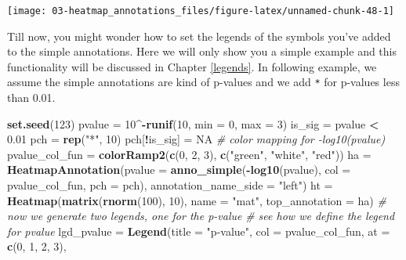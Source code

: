 \documentclass[]{book}
\newenvironment{Shaded}{\begin{snugshade}}{\end{snugshade}}
\newcommand{\KeywordTok}[1]{\textcolor[rgb]{0.13,0.29,0.53}{\textbf{#1}}}
\newcommand{\DataTypeTok}[1]{\textcolor[rgb]{0.13,0.29,0.53}{#1}}
\newcommand{\DecValTok}[1]{\textcolor[rgb]{0.00,0.00,0.81}{#1}}
\newcommand{\FloatTok}[1]{\textcolor[rgb]{0.00,0.00,0.81}{#1}}
\newcommand{\StringTok}[1]{\textcolor[rgb]{0.31,0.60,0.02}{#1}}
\newcommand{\CommentTok}[1]{\textcolor[rgb]{0.56,0.35,0.01}{\textit{#1}}}
\newcommand{\OtherTok}[1]{\textcolor[rgb]{0.56,0.35,0.01}{#1}}
\newcommand{\OperatorTok}[1]{\textcolor[rgb]{0.81,0.36,0.00}{\textbf{#1}}}
\newcommand{\NormalTok}[1]{#1}
\theoremstyle{definition}
\theoremstyle{definition}
\theoremstyle{definition}
\theoremstyle{remark}
\begin{document}
\begin{center}\texttt{[image: 03-heatmap\_annotations\_files/figure-latex/unnamed-chunk-48-1]} \end{center}

Till now, you might wonder how to set the legends of the symbols you've
added to the simple annotations. Here we will only show you a simple
example and this functionality will be discussed in Chapter
\ref{legends}. In following example, we assume the simple annotations
are kind of p-values and we add \texttt{*} for p-values less than 0.01.

\begin{Shaded}
\begin{Highlighting}[]
\KeywordTok{set.seed}\NormalTok{(}\DecValTok{123}\NormalTok{)}
\NormalTok{pvalue =}\StringTok{ }\DecValTok{10}\OperatorTok{^-}\KeywordTok{runif}\NormalTok{(}\DecValTok{10}\NormalTok{, }\DataTypeTok{min =} \DecValTok{0}\NormalTok{, }\DataTypeTok{max =} \DecValTok{3}\NormalTok{)}
\NormalTok{is_sig =}\StringTok{ }\NormalTok{pvalue }\OperatorTok{<}\StringTok{ }\FloatTok{0.01}
\NormalTok{pch =}\StringTok{ }\KeywordTok{rep}\NormalTok{(}\StringTok{"*"}\NormalTok{, }\DecValTok{10}\NormalTok{)}
\NormalTok{pch[}\OperatorTok{!}\NormalTok{is_sig] =}\StringTok{ }\OtherTok{NA}
\CommentTok{# color mapping for -log10(pvalue)}
\NormalTok{pvalue_col_fun =}\StringTok{ }\KeywordTok{colorRamp2}\NormalTok{(}\KeywordTok{c}\NormalTok{(}\DecValTok{0}\NormalTok{, }\DecValTok{2}\NormalTok{, }\DecValTok{3}\NormalTok{), }\KeywordTok{c}\NormalTok{(}\StringTok{"green"}\NormalTok{, }\StringTok{"white"}\NormalTok{, }\StringTok{"red"}\NormalTok{)) }
\NormalTok{ha =}\StringTok{ }\KeywordTok{HeatmapAnnotation}\NormalTok{(}\DataTypeTok{pvalue =} \KeywordTok{anno_simple}\NormalTok{(}\OperatorTok{-}\KeywordTok{log10}\NormalTok{(pvalue), }\DataTypeTok{col =}\NormalTok{ pvalue_col_fun, }\DataTypeTok{pch =}\NormalTok{ pch),}
    \DataTypeTok{annotation_name_side =} \StringTok{"left"}\NormalTok{)}
\NormalTok{ht =}\StringTok{ }\KeywordTok{Heatmap}\NormalTok{(}\KeywordTok{matrix}\NormalTok{(}\KeywordTok{rnorm}\NormalTok{(}\DecValTok{100}\NormalTok{), }\DecValTok{10}\NormalTok{), }\DataTypeTok{name =} \StringTok{"mat"}\NormalTok{, }\DataTypeTok{top_annotation =}\NormalTok{ ha)}
\CommentTok{# now we generate two legends, one for the p-value}
\CommentTok{# see how we define the legend for pvalue}
\NormalTok{lgd_pvalue =}\StringTok{ }\KeywordTok{Legend}\NormalTok{(}\DataTypeTok{title =} \StringTok{"p-value"}\NormalTok{, }\DataTypeTok{col =}\NormalTok{ pvalue_col_fun, }\DataTypeTok{at =} \KeywordTok{c}\NormalTok{(}\DecValTok{0}\NormalTok{, }\DecValTok{1}\NormalTok{, }\DecValTok{2}\NormalTok{, }\DecValTok{3}\NormalTok{), }

\end{Highlighting}
\end{Shaded}
\end{document}
